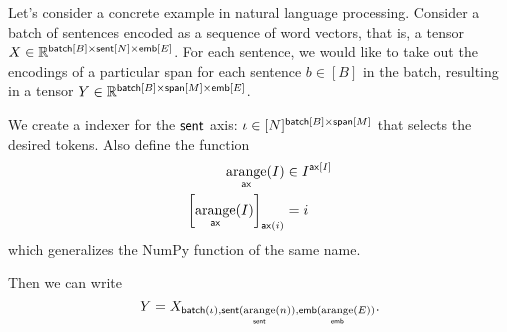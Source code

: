 Let's consider a concrete example in natural language processing. Consider a batch of sentences encoded as a sequence of word vectors, that is, a tensor $X \in \mathbb{R}^{\mathsf{batch}[B] \times \mathsf{sent}[N] \times \mathsf{emb}[E]}$. For each sentence, we would like to take out the encodings of a particular span for each sentence $b \in [B]$ in the batch, resulting in a tensor $Y \in \mathbb{R}^{\mathsf{batch}[B] \times \mathsf{span}[M] \times \mathsf{emb}[E]}$.

We create a indexer for the $\mathsf{sent}$ axis: $\iota \in [N]^{\mathsf{batch}[B] \times \mathsf{span}[M]}$ that selects the desired tokens. Also define the function
\begin{align*}
  \mathop{\underset{\mathsf{ax}}{\mathrm{arange}}}(I) &\in I^{\mathsf{ax}[I]} \\
  \left[\mathop{\underset{\mathsf{ax}}{\mathrm{arange}}}(I)\right]_{\mathsf{ax}(i)} &= i
\end{align*}
which generalizes the NumPy function of the same name.

Then we can write
\begin{equation*}
  Y = X_{\mathsf{batch}(\iota), \mathsf{sent}(\mathop{\underset{\mathsf{sent}}{\mathrm{arange}}}(n)), \mathsf{emb}(\mathop{\underset{\mathsf{emb}}{\mathrm{arange}}}(E))}.
\end{equation*}
